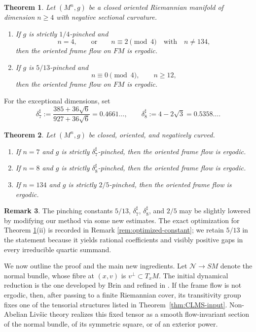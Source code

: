 \documentclass[reqno,11pt]{amsart}
\newtheorem{theorem}{Theorem}[section]
\theoremstyle{definition}
\newtheorem{remark}[theorem]{Remark}
\newcommand{\SM}{SM}
\newcommand{\FM}{FM}
\newcommand{\cN}{\mathcal N}
\begin{document}
\begin{theorem}\label{thm:stable-main}
Let $(M^n,g)$ be a closed oriented Riemannian manifold of dimension $n\geq4$
with negative sectional curvature.
\begin{enumerate}[label=\textup{(\roman*)}]
\item If $g$ is strictly $1/4$-pinched and
$$
  n=4,
  \qquad\text{or}\qquad
  n\equiv2\pmod4\quad\text{with}\quad n\neq134,
$$
then the oriented frame flow on $\FM$ is ergodic.
\item If $g$ is $5/13$-pinched and
$$
  n\equiv0\pmod4,
  \qquad n\geq12,
$$
then the oriented frame flow on $\FM$ is ergodic.
\end{enumerate}
\end{theorem}

For the exceptional dimensions, set
$$
\delta_7^\sharp:=\frac{385+36\sqrt6}{927+36\sqrt6}=0.4661\ldots, \qquad
 \delta_8^\sharp:=4-2\sqrt3=0.5358\ldots.
$$

\begin{theorem}\label{thm:exceptional-main}
Let $(M^n,g)$ be closed, oriented, and negatively curved.
\begin{enumerate}[label=\textup{(\roman*)}]
\item If $n=7$ and $g$ is strictly $\delta_7^\sharp$-pinched, then the
oriented frame flow is ergodic.
\item If $n=8$ and $g$ is strictly $\delta_8^\sharp$-pinched, then the
oriented frame flow is ergodic.
\item If $n=134$ and $g$ is strictly $2/5$-pinched, then the oriented frame
flow is ergodic.
\end{enumerate}
\end{theorem}





\begin{remark}\label{rem:intro-improvement}
The pinching constants $5/13$, $\delta_7^\sharp$, $\delta_8^\sharp$, and
$2/5$ may be slightly lowered by modifying our method via some new estimates.  The exact optimization
for Theorem \ref{thm:stable-main}\textup{(ii)} is recorded in
Remark \ref{rem:optimized-constant}; we retain $5/13$ in the statement
because it yields rational coefficients and visibly positive gaps in
every irreducible quartic summand.
\end{remark}


We now outline the proof and the main new ingredients.  Let
\(\cN\to\SM\) denote the normal bundle, whose fibre at \((x,v)\) is
\(v^\perp\subset T_xM\).  The initial dynamical reduction is the one
developed by Brin
\cite{Brin75Topology,Brin75Transitivity}
and refined in
\cite{CekicLefeuvreHolonomy25,CLMS24}.  If the frame flow is not
ergodic, then, after passing to a finite Riemannian cover, its
transitivity group fixes one of the tensorial structures listed in
Theorem~\ref{thm:CLMS-input}.  Non-Abelian Liv\v{s}ic theory realizes
this fixed tensor as a smooth flow-invariant section of the normal
bundle, of its symmetric square, or of an exterior power.
\end{document}
